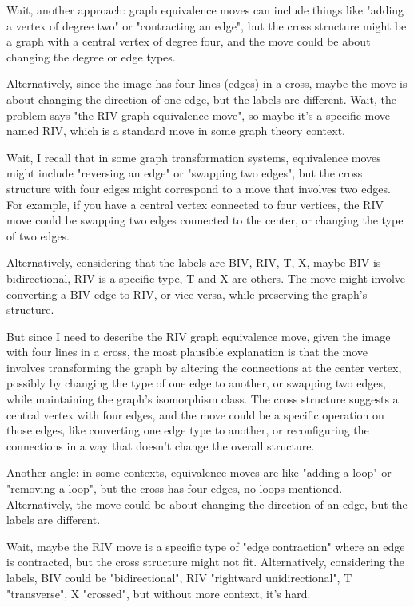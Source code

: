Wait, another approach: graph equivalence moves can include things like "adding a vertex of degree two" or "contracting an edge", but the cross structure might be a graph with a central vertex of degree four, and the move could be about changing the degree or edge types. 

Alternatively, since the image has four lines (edges) in a cross, maybe the move is about changing the direction of one edge, but the labels are different. Wait, the problem says "the RIV graph equivalence move", so maybe it's a specific move named RIV, which is a standard move in some graph theory context. 

Wait, I recall that in some graph transformation systems, equivalence moves might include "reversing an edge" or "swapping two edges", but the cross structure with four edges might correspond to a move that involves two edges. For example, if you have a central vertex connected to four vertices, the RIV move could be swapping two edges connected to the center, or changing the type of two edges. 

Alternatively, considering that the labels are BIV, RIV, T, X, maybe BIV is bidirectional, RIV is a specific type, T and X are others. The move might involve converting a BIV edge to RIV, or vice versa, while preserving the graph's structure. 

But since I need to describe the RIV graph equivalence move, given the image with four lines in a cross, the most plausible explanation is that the move involves transforming the graph by altering the connections at the center vertex, possibly by changing the type of one edge to another, or swapping two edges, while maintaining the graph's isomorphism class. The cross structure suggests a central vertex with four edges, and the move could be a specific operation on those edges, like converting one edge type to another, or reconfiguring the connections in a way that doesn't change the overall structure. 

Another angle: in some contexts, equivalence moves are like "adding a loop" or "removing a loop", but the cross has four edges, no loops mentioned. Alternatively, the move could be about changing the direction of an edge, but the labels are different. 

Wait, maybe the RIV move is a specific type of "edge contraction" where an edge is contracted, but the cross structure might not fit. Alternatively, considering the labels, BIV could be "bidirectional", RIV "rightward unidirectional", T "transverse", X "crossed", but without more context, it's hard. 

